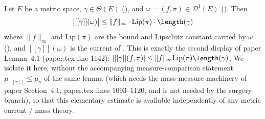 \begin{lemma}
  Let $E$ be a metric space, $\gamma \in \Theta(E)$ (), and
  $\omega = (f,\pi) \in \mathcal{D}^1(E)$ (). Then
  \[
    \bigl| [[\gamma]](\omega) \bigr| \le \|f\|_\infty \cdot \mathrm{Lip}(\pi) \cdot \length(\gamma)
  \]
  where $\|f\|_\infty$ and $\mathrm{Lip}(\pi)$ are the bound and Lipschitz constant carried by
  $\omega$ (), and $[[\gamma]](\omega)$ is the current of .
  This is exactly the second display of paper Lemma~4.1 (paper.tex line 1142):
  $|[[\gamma]](f,\pi)| \le \|f\|_\infty \mathrm{Lip}(\pi) \length(\gamma)$. We isolate it here,
  without the accompanying measure-comparison statement $\mu_{[[\gamma]]} \le \mu_\gamma$ of the
  same lemma (which needs the mass-measure machinery of paper Section~4.1, paper.tex lines
  1093--1120, and is not needed by the surgery branch), so that this elementary estimate is
  available independently of any metric current / mass theory.
\end{lemma}
